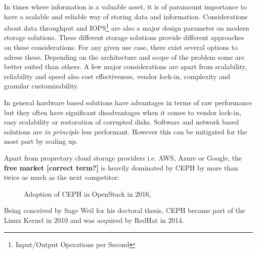 \documentclass[titlepage, a4paper, 11pt]{scrartcl}
\begin{document}
        In times where information is a valuable asset, it is of paramount importance to have a scalable and reliable
        way of storing data and information. Considerations about data throughput and 
        IOPS\footnote{Input/Output Operations per Second} are also a major design parameter on modern storage solutions.
        These different storage solutions provide different approaches on these considerations. For any given use case, there
        exist several options to adress these. Depending on the architecture and scope of the problem some are better
        suited than others. A few major considerations are apart from scalability, reliability and speed also cost effectiveness,
        vendor lock-in, complexity and granular customizability.

        In general hardware based solutions have advantages in terms of raw performance but they often have significant disadvantages
        when it comes to vendor lock-in, easy scalability or restoration of corrupted disks. Software and network based solutions are
        \textit{in principle} less performant. However this can be mitigated for the most part by scaling up.

        Apart from propretary cloud storage providers i.e. AWS, Azure or Google, the \textbf{free market [correct term?]}
        is heavily dominated by CEPH by more than twice as much as the next competitor:

        \begin{figure}[H]
            \centering
            \caption{Adoption of CEPH in OpenStack in 2016, \cite{ceph}}
            \label{fig:ceph-market-share}
        \end{figure}

        Being conceived by Sage Weil for his doctoral thesis\cite{weil2007ceph}, CEPH became part of the Linux Kernel in 2010 and was acquired
        by RedHat in 2014. 
\end{document}
